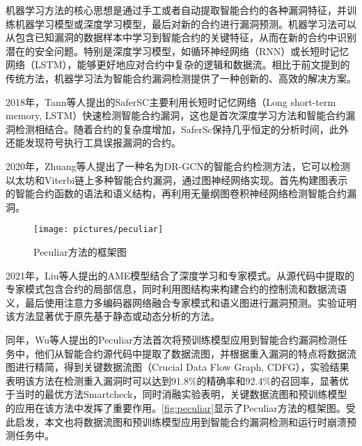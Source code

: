     机器学习方法的核心思想是通过手工或者自动提取智能合约的各种漏洞特征，并训练机器学习模型或深度学习模型，最后对新的合约进行漏洞预测。机器学习法可以从包含已知漏洞的数据样本中学习到智能合约的关键特征，从而在新的合约中识别潜在的安全问题。特别是深度学习模型，如循环神经网络（RNN）或长短时记忆网络（LSTM），能够更好地应对合约中复杂的逻辑和数据流。相比于前文提到的传统方法，机器学习法为智能合约漏洞检测提供了一种创新的、高效的解决方案\cite{cui2024}。

    2018年，Tann等人提出的SaferSC\cite{tann2018towards}主要利用长短时记忆网络（Long short-term memory, LSTM）快速检测智能合约漏洞，这也是首次深度学习方法和智能合约漏洞检测相结合。随着合约的复杂度增加，SaferSc保持几乎恒定的分析时间，此外还能发现符号执行工具误报漏洞的合约。

    2020年，Zhuang等人提出了一种名为DR-GCN\cite{zhuang2021smart}的智能合约检测方法，它可以检测以太坊和Viterbi链上多种智能合约漏洞，通过图神经网络实现。首先构建图表示的智能合约函数的语法和语义结构，再利用无量纲图卷积神经网络检测智能合约漏洞。

    \begin{figure}[htbp]
        \centering
        \texttt{[image: pictures/peculiar]}
        \caption{\label{fig:peculiar}Peculiar方法的框架图}
    \end{figure}
    
    2021年，Liu等人提出的AME\cite{liu2021smart}模型结合了深度学习和专家模式。从源代码中提取的专家模式包含合约的局部信息，同时利用图结构来构建合约的控制流和数据流语义，最后使用注意力多编码器网络融合专家模式和语义图进行漏洞预测。实验证明该方法显著优于原先基于静态或动态分析的方法。

    同年，Wu等人提出的Peculiar方法\cite{wu2021peculiar}首次将预训练模型应用到智能合约漏洞检测任务中，他们从智能合约源代码中提取了数据流图，并根据重入漏洞的特点将数据流图进行精简，得到关键数据流图（Crucial Data Flow Graph, CDFG），实验结果表明该方法在检测重入漏洞时可以达到91.8\%的精确率和92.4\%的召回率，显著优于当时的最优方法Smartcheck\cite{smartcheck}，同时消融实验表明，关键数据流图和预训练模型的应用在该方法中发挥了重要作用。\autoref{fig:peculiar}显示了Peculiar方法的框架图。受此启发，本文也将数据流图和预训练模型应用到智能合约漏洞检测和运行时崩溃预测任务中。
    



